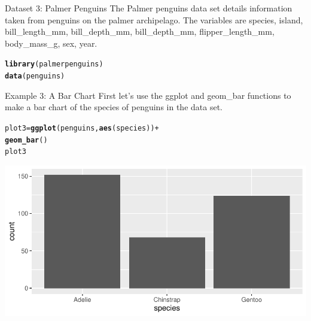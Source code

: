 \documentclass{beamer}\usepackage[]{graphicx}\usepackage[]{color}
\makeatletter
\newcommand{\hlopt}[1]{\textcolor[rgb]{0,0,0}{#1}}%
\newcommand{\hlstd}[1]{\textcolor[rgb]{0.345,0.345,0.345}{#1}}%
\newcommand{\hlkwb}[1]{\textcolor[rgb]{0.69,0.353,0.396}{#1}}%
\newcommand{\hlkwd}[1]{\textcolor[rgb]{0.737,0.353,0.396}{\textbf{#1}}}%
\newenvironment{kframe}{%
 \def\at@end@of@kframe{}%
 \ifinner\ifhmode%
  \def\at@end@of@kframe{\end{minipage}}%
  \begin{minipage}{\columnwidth}%
 \fi\fi%
 \def\FrameCommand##1{\hskip\@totalleftmargin \hskip-\fboxsep
 \colorbox{shadecolor}{##1}\hskip-\fboxsep
     \hskip-\linewidth \hskip-\@totalleftmargin \hskip\columnwidth}%
 \MakeFramed {\advance\hsize-\width
   \@totalleftmargin\z@ \linewidth\hsize
   \@setminipage}}%
 {\par\unskip\endMakeFramed%
 \at@end@of@kframe}
\newenvironment{knitrout}{}{} %
\makeatother
\begin{document}
\begin{frame}[fragile]{Dataset 3:  Palmer Penguins}
The Palmer penguins data set details information taken from penguins on the palmer archipelago.  The variables are
species, island, bill\_length\_mm, bill\_depth\_mm, bill\_depth\_mm, flipper\_length\_mm, body\_mass\_g, sex, year.
\begin{knitrout}
\color{fgcolor}\begin{kframe}
\begin{alltt}
\hlkwd{library}\hlstd{(palmerpenguins)}
\hlkwd{data}\hlstd{(penguins)}
\end{alltt}
\end{kframe}
\end{knitrout}
\end{frame}

\begin{frame}[fragile]{Example 3: A Bar Chart}
First let's use the ggplot and geom\_bar functions to make a bar chart of the species of penguins in the data set.
\begin{knitrout}
\color{fgcolor}\begin{kframe}
\begin{alltt}
\hlstd{plot3} \hlkwb{=} \hlkwd{ggplot}\hlstd{(penguins,} \hlkwd{aes}\hlstd{(species))} \hlopt{+}
    \hlkwd{geom_bar}\hlstd{()}
\hlstd{plot3}
\end{alltt}
\end{kframe}
\includegraphics[width=0.95\linewidth]{figure/unnamed-chunk-9-1} 
\end{knitrout}

\end{frame}
\end{document}
